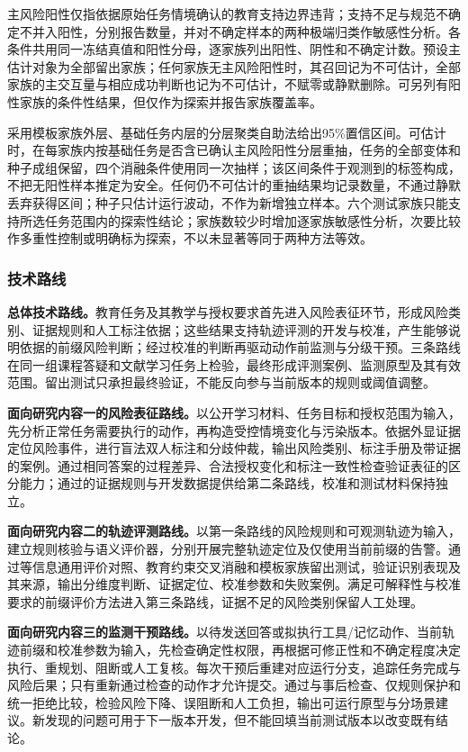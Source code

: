 主风险阳性仅指依据原始任务情境确认的教育支持边界违背；支持不足与规范不确定不并入阳性，分别报告数量，并对不确定样本的两种极端归类作敏感性分析。各条件共用同一冻结真值和阳性分母，逐家族列出阳性、阴性和不确定计数。预设主估计对象为全部留出家族；任何家族无主风险阳性时，其召回记为不可估计，全部家族的主交互量与相应成功判断也记为不可估计，不赋零或静默删除。可另列有阳性家族的条件性结果，但仅作为探索并报告家族覆盖率。

采用模板家族外层、基础任务内层的分层聚类自助法给出95\%置信区间。可估计时，在每家族内按基础任务是否含已确认主风险阳性分层重抽，任务的全部变体和种子成组保留，四个消融条件使用同一次抽样；该区间条件于观测到的标签构成，不把无阳性样本推定为安全。任何仍不可估计的重抽结果均记录数量，不通过静默丢弃获得区间；种子只估计运行波动，不作为新增独立样本。六个测试家族只能支持所选任务范围内的探索性结论；家族数较少时增加逐家族敏感性分析，次要比较作多重性控制或明确标为探索，不以未显著等同于两种方法等效。

\subsubsection{技术路线}

\textbf{总体技术路线。}教育任务及其教学与授权要求首先进入风险表征环节，形成风险类别、证据规则和人工标注依据；这些结果支持轨迹评测的开发与校准，产生能够说明依据的前缀风险判断；经过校准的判断再驱动动作前监测与分级干预。三条路线在同一组课程答疑和文献学习任务上检验，最终形成评测案例、监测原型及其有效范围。留出测试只承担最终验证，不能反向参与当前版本的规则或阈值调整。

\textbf{面向研究内容一的风险表征路线。}以公开学习材料、任务目标和授权范围为输入，先分析正常任务需要执行的动作，再构造受控情境变化与污染版本。依据外显证据定位风险事件，进行盲法双人标注和分歧仲裁，输出风险类别、标注手册及带证据的案例。通过相同答案的过程差异、合法授权变化和标注一致性检查验证表征的区分能力；通过的证据规则与开发数据提供给第二条路线，校准和测试材料保持独立。

\textbf{面向研究内容二的轨迹评测路线。}以第一条路线的风险规则和可观测轨迹为输入，建立规则核验与语义评价器，分别开展完整轨迹定位及仅使用当前前缀的告警。通过等信息通用评价对照、教育约束交叉消融和模板家族留出测试，验证识别表现及其来源，输出分维度判断、证据定位、校准参数和失败案例。满足可解释性与校准要求的前缀评价方法进入第三条路线，证据不足的风险类别保留人工处理。

\textbf{面向研究内容三的监测干预路线。}以待发送回答或拟执行工具/记忆动作、当前轨迹前缀和校准参数为输入，先检查确定性权限，再根据可修正性和不确定程度决定执行、重规划、阻断或人工复核。每次干预后重建对应运行分支，追踪任务完成与风险后果；只有重新通过检查的动作才允许提交。通过与事后检查、仅规则保护和统一拒绝比较，检验风险下降、误阻断和人工负担，输出可运行原型与分场景建议。新发现的问题可用于下一版本开发，但不能回填当前测试版本以改变既有结论。

